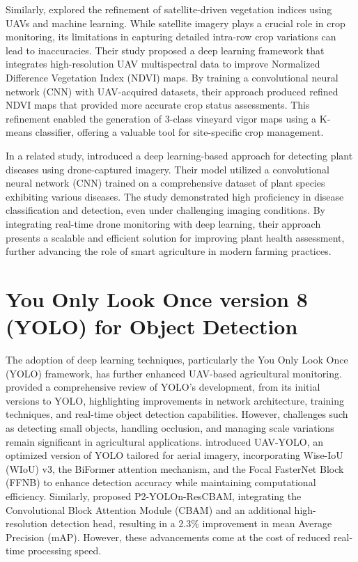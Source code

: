 Similarly, \cite{Mazzia2020} explored the refinement of satellite-driven vegetation indices using UAVs and machine learning. While satellite imagery plays a crucial role in crop monitoring, its limitations in capturing detailed intra-row crop variations can lead to inaccuracies. Their study proposed a deep learning framework that integrates high-resolution UAV multispectral data to improve Normalized Difference Vegetation Index (NDVI) maps. By training a convolutional neural network (CNN) with UAV-acquired datasets, their approach produced refined NDVI maps that provided more accurate crop status assessments. This refinement enabled the generation of 3-class vineyard vigor maps using a K-means classifier, offering a valuable tool for site-specific crop management.

In a related study, \cite{Vardhan2023} introduced a deep learning-based approach for detecting plant diseases using drone-captured imagery. Their model utilized a convolutional neural network (CNN) trained on a comprehensive dataset of plant species exhibiting various diseases. The study demonstrated high proficiency in disease classification and detection, even under challenging imaging conditions. By integrating real-time drone monitoring with deep learning, their approach presents a scalable and efficient solution for improving plant health assessment, further advancing the role of smart agriculture in modern farming practices.

\section{You Only Look Once version 8 (YOLO) for Object Detection}
The adoption of deep learning techniques, particularly the You Only Look Once (YOLO) framework, has further enhanced UAV-based agricultural monitoring. \cite{Terven2023} provided a comprehensive review of YOLO’s development, from its initial versions to YOLO, highlighting improvements in network architecture, training techniques, and real-time object detection capabilities. However, challenges such as detecting small objects, handling occlusion, and managing scale variations remain significant in agricultural applications. \cite{Wang2023} introduced UAV-YOLO, an optimized version of YOLO tailored for aerial imagery, incorporating Wise-IoU (WIoU) v3, the BiFormer attention mechanism, and the Focal FasterNet Block (FFNB) to enhance detection accuracy while maintaining computational efficiency. Similarly, \cite{Zamri2024} proposed P2-YOLOn-ResCBAM, integrating the Convolutional Block Attention Module (CBAM) and an additional high-resolution detection head, resulting in a 2.3\% improvement in mean Average Precision (mAP). However, these advancements come at the cost of reduced real-time processing speed.

